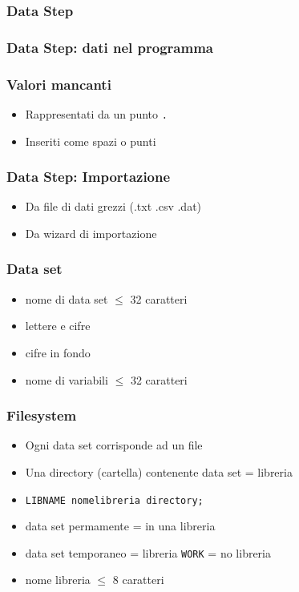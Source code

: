 \documentclass[12pt]{beamer}
\begin{document}
\begin{frame}[fragile]\frametitle{Data Step}
\end{frame}

\begin{frame}\frametitle{Data Step: dati nel programma}
\end{frame}


\begin{frame}\frametitle{Valori mancanti}
  \begin{itemize}
  \item
    Rappresentati da un punto \texttt{.}
  \item
    Inseriti come spazi o punti
  \end{itemize}\end{frame}

\begin{frame}\frametitle{Data Step: Importazione}
  \begin{itemize}
  \item
    Da file di dati grezzi (.txt .csv .dat)
  \item
    Da wizard di importazione
  \end{itemize}
\end{frame}

\begin{frame}\frametitle{Data set}
  \begin{itemize}
  \item
    nome di data set $\le$ 32 caratteri
  \item
    lettere e cifre
  \item
    cifre in fondo
  \item
    nome di variabili $\le$ 32 caratteri
  \end{itemize}
\end{frame}


\begin{frame}\frametitle{Filesystem}
  \begin{itemize}
  \item
    Ogni data set corrisponde ad un file
  \item
    Una directory (cartella) contenente data set = \alert{libreria}
  \item
    \texttt{LIBNAME nomelibreria directory;}
  \item
    data set permamente = in una libreria
  \item
    data set temporaneo = libreria \texttt{WORK} = no libreria
  \item
    nome libreria $\le$ 8 caratteri
  \end{itemize}\end{frame}
\end{document}
